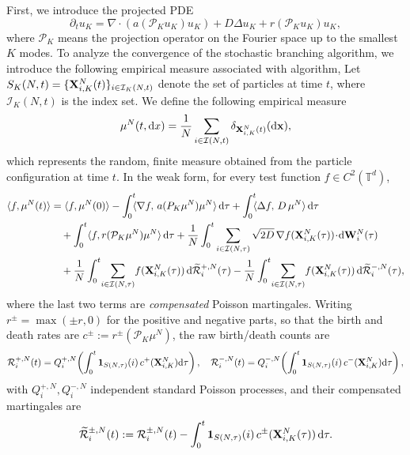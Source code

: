 \documentclass[a4paper,fleqn]{cas-sc}
\theoremstyle{definition}
\theoremstyle{remark}
\begin{document}
First, we introduce the projected PDE 
\begin{equation}\label{equ:projected}
    \partial_t u_K  = \nabla \cdot \left( a (\mathcal P_K u_K) u_K\right) + D \Delta u_K  + r\left(\mathcal P_K u_K\right)  u_K, 
\end{equation}
where $\mathcal P_K$ means the projection operator on the Fourier space up to the smallest $K$ modes. To analyze the convergence of the stochastic branching algorithm, we introduce the following empirical measure associated with algorithm,
Let $S_K(N,t) = \{\mathbf{X}^N_{i,K}(t) \}_{i\in \mathcal I_K(N,t)}$ denote the set of particles at time $t$, where
 $\mathcal{I}_K(N,t)$ is the index set. We define the following empirical measure \[
 \mu^N(t,\mathrm{d} x) = \frac{1}{N} \sum_{i\in \mathcal I(N,t)} \delta_{\mathbf{X}^N_{i,K}(t)}(\mathrm{d} \mathbf{x}),
 \] which represents the random, finite measure obtained from the particle configuration at time $t$. In the weak form, for every test function $f \in C^2(\mathbb T^d)$,
 \begin{equation}\label{eq:weak-form}
     \begin{aligned}
\langle f, \mu^N(t)\rangle
&= \langle f, \mu^N(0)\rangle
 - \int_0^t
   \!\!\langle\nabla f,\,a(P_K\mu^N)\mu^N\rangle\,\intd\tau
 + \int_0^t
   \!\!\langle\Delta f,\,D\,\mu^N\rangle\,\intd\tau \\
&\quad + \int_0^t \langle f, r(\mathcal P_K \mu^N)\mu^N\rangle\,\intd\tau 
 + \frac{1}{N}\int_0^t\sum_{i\in\mathcal I(N,\tau)}
   \sqrt{2D}\,\nabla f(\bX_{i,K}^N(\tau))\!\cdot\! \intd \bW^N_i(\tau)\\
 &\quad + \frac{1}{N}\int_0^t\!\sum_{i\in\mathcal I(N,\tau)}\!
   f(\bX_{i,K}^N(\tau))\, \intd \widetilde{\mathcal R}^{+,N}_i(\tau)
 - \frac{1}{N}\int_0^t\!\sum_{i\in\mathcal I(N,\tau)}\!
   f(\bX_{i,K}^N(\tau))\, \intd \widetilde{\mathcal R}^{-,N}_i(\tau),
\end{aligned}
 \end{equation}
where the last two terms are \emph{compensated} Poisson martingales. Writing
$r^\pm=\max(\pm r,0)$ for the positive and negative parts, so that the birth and
death rates are $c^\pm:=r^\pm(\mathcal P_K\mu^N)$, the raw birth/death counts are
\[
\mathcal R^{+,N}_i(t)=Q^{+,N}_i\!\left(\int_{0}^{t} \mathbf 1 _{S(N,\tau)}(i)\,c^+(\mathbf{X}^N_{i,K})\mathrm{d} \tau\right),
\quad
\mathcal R^{-,N}_i(t)=Q^{-,N}_i\!\left(\int_{0}^{t} \mathbf 1 _{S(N,\tau)}(i)\,c^-(\mathbf{X}^N_{i,K})\mathrm{d} \tau\right),
\]
with $Q^{+,N}_i,Q^{-,N}_i$ independent standard Poisson processes, and their
compensated martingales are
\[
\widetilde{\mathcal R}^{\pm,N}_i(t):=\mathcal R^{\pm,N}_i(t)
-\int_0^t \mathbf 1 _{S(N,\tau)}(i)\,c^\pm(\mathbf{X}^N_{i,K}(\tau))\,\mathrm{d}\tau .
\]
\end{document}
